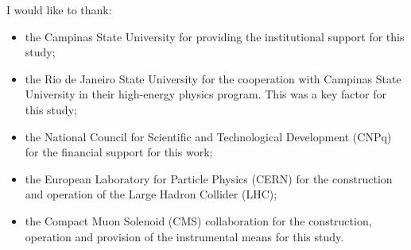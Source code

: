 \documentclass[ 
11pt, %
english, %
onehalfspacing, %
nolistspacing, %
parskip, %
headsepline, %
chapterinoneline, %
]{MastersDoctoralThesis} %
\begin{document}
\begin{acknowledgements}
\addchaptertocentry{\acknowledgementname} %
I would like to thank:
\begin{itemize}
  \item the Campinas State University for providing the institutional support for this study;
  \item the Rio de Janeiro State University for the cooperation with Campinas State University in their high-energy physics program. This was a key factor for this study;
  \item the National Council for Scientific and Technological Development (CNPq) for the financial support for this work;
  \item the European Laboratory for Particle Physics (CERN) for the construction and operation of the Large Hadron Collider (LHC);
  \item the Compact Muon Solenoid (CMS) collaboration for the construction, operation and provision of the instrumental means for this study.
\end{itemize}

\end{acknowledgements}

\listoftodos

\tableofcontents %

\listoffigures %

\listoftables %



%
%
\end{document}
